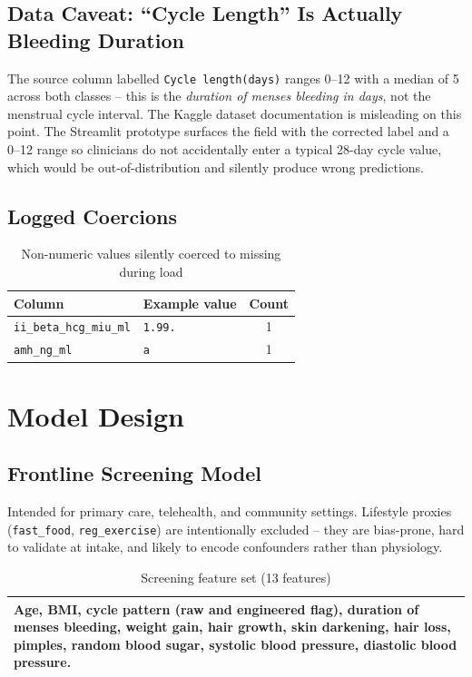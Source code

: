 \documentclass[11pt]{article}
\newcommand{\code}[1]{\texttt{\small #1}}
\begin{document}
\subsection{Data Caveat: ``Cycle Length'' Is Actually Bleeding Duration}

The source column labelled \code{Cycle length(days)} ranges 0--12 with a median of 5 across both classes -- this is the \emph{duration of menses bleeding in days}, not the menstrual cycle interval. The Kaggle dataset documentation is misleading on this point. The Streamlit prototype surfaces the field with the corrected label and a 0--12 range so clinicians do not accidentally enter a typical 28-day cycle value, which would be out-of-distribution and silently produce wrong predictions.

\subsection{Logged Coercions}

\begin{table}[H]
\centering
\caption{Non-numeric values silently coerced to missing during load}
\begin{tabular}{llc}
\toprule
Column & Example value & Count \\
\midrule
\code{ii\_beta\_hcg\_miu\_ml} & \code{1.99.} & 1 \\
\code{amh\_ng\_ml} & \code{a} & 1 \\
\bottomrule
\end{tabular}
\end{table}

\section{Model Design}

\subsection{Frontline Screening Model}

Intended for primary care, telehealth, and community settings. Lifestyle proxies (\code{fast\_food}, \code{reg\_exercise}) are intentionally excluded -- they are bias-prone, hard to validate at intake, and likely to encode confounders rather than physiology.

\begin{table}[H]
\centering
\caption{Screening feature set (13 features)}
\begin{tabularx}{\linewidth}{>{\raggedright\arraybackslash}X}
\toprule
Age, BMI, cycle pattern (raw and engineered flag), duration of menses bleeding, weight gain, hair growth, skin darkening, hair loss, pimples, random blood sugar, systolic blood pressure, diastolic blood pressure. \\
\bottomrule
\end{tabularx}
\end{table}
\end{document}
